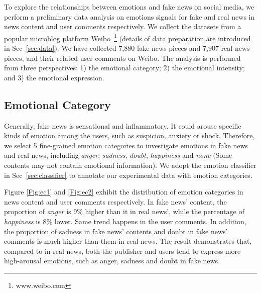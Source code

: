 \documentclass{article}
\newcommand{\kai}[1]{\textcolor{blue}{Kai: {#1}}}
\begin{document}
	To explore the relationships between emotions and fake news on social media, we perform a preliminary data analysis on emotions signals for fake and real news in news content and user comments respectively. We collect the datasets from a popular microblog platform Weibo~\footnote{www.weibo.com} (details of data preparation are introduced in Sec~\ref{sec:data}). We have collected 7,880 fake news pieces and 7,907 real news pieces, and their related user comments on Weibo. The analysis is performed from three perspectives: 1) the emotional category; 2) the emotional intensity; and 3) the emotional expression.
	
	\subsection{Emotional Category}
	Generally, fake news is sensational and inflammatory. It could arouse specific kinds of emotion among the users, such as suspicion, anxiety or shock. Therefore, we select 5 fine-grained emotion categories to investigate emotions in fake news and real news, including \textit{anger}, \textit{sadness}, \textit{doubt}, \textit{happiness} and \textit{none} (Some contents may not contain emotional information). We adopt the emotion classifier in Sec~\ref{sec:classifier} to annotate our experimental data with emotion categories. 
	
	Figure \ref{Fig:ec1} and \ref{Fig:ec2} exhibit the distribution of emotion categories in news content and user comments respectively. In fake news' content, the proportion of \textit{anger} is 9\% higher than it in real news’, while the percentage of \textit{happiness} is 8\% lower. Same trend happens in the user comments. In addition, the proportion of sadness in fake news' contents and doubt in fake news' comments is much higher than them in real news.  The result demonstrates that, compared to in real news, both the publisher and users tend to express more high-arousal emotions, such as anger, sadness and doubt in fake news.
	
\end{document}
